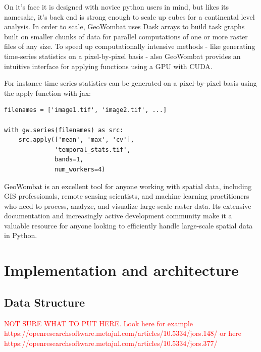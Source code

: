 \documentclass{jors}
\begin{document}
On it's face it is designed with novice python users in mind, but likes its namesake, it's back end is strong enough to scale up cubes for a continental level analysis.  In order to scale, GeoWombat uses Dask arrays to build task graphs built on smaller chunks of data for parallel computations of one or more raster files of any size. To speed up computationally intensive methods - like generating time-series statistics on a pixel-by-pixel basis - also GeoWombat provides an intuitive interface for applying functions using a GPU with CUDA. \newline

For instance time series statistics can be generated on a pixel-by-pixel basis using the apply function with jax:

\begin{verbatim}
filenames = ['image1.tif', 'image2.tif', ...]

with gw.series(filenames) as src:
    src.apply(['mean', 'max', 'cv'],
              'temporal_stats.tif',
              bands=1,
              num_workers=4)    
\end{verbatim}

GeoWombat is an excellent tool for anyone working with spatial data, including GIS professionals, remote sensing scientists, and machine learning practitioners who need to process, analyze, and visualize large-scale raster data. Its extensive documentation and increasingly active development community make it a valuable resource for anyone looking to efficiently handle large-scale spatial data in Python.


\section{Implementation and architecture}

\subsection*{Data Structure}

\textcolor{red}{   NOT SURE WHAT TO PUT HERE. Look here for example \newline
https://openresearchsoftware.metajnl.com/articles/10.5334/jors.148/ or here \newline
https://openresearchsoftware.metajnl.com/articles/10.5334/jors.377/}
\end{document}

